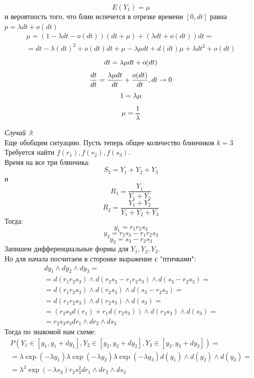 \documentclass[12pt]{article} %
\theoremstyle{definition} %
\begin{document}
\[
    E(Y_1) = \mu
\]
и вероятность того, что блин испечется в отрезке времени $[0, dt]$ равна $p = \lambda dt + o(dt)$
\begin{eqnarray*}
    \mu = (1 - \lambda dt - o(dt)) (dt + \mu) + (\lambda dt + o(dt)) dt =\\
    = dt - \lambda(dt)^2 + o(dt)dt + \mu - \lambda \mu dt + d(dt) \mu + \lambda dt^2 + o(dt)
\end{eqnarray*}
\[
    dt = \lambda \mu dt + o(dt)\\
\]
\[
    \frac{dt}{dt} = \frac{\lambda \mu dt}{dt} + \frac{o(dt)}{dt}, dt \rightarrow 0\\
\]
\[
    1 = \lambda \mu\\
\]
\[
    \mu = \frac{1}{\lambda}
\]

\textit{Случай 3}:\\
Еще обобщим ситуацию. Пусть теперь общее количество блинчиков $k = 3$\\
Требуется найти $f(r_1), f(r_2), f(s_3)$.\\
Время на все три блинчика:
\[
    S_3 = Y_1 + Y_2 + Y_3
\]
и
\[
    R_1 = \frac{Y_1}{Y_1 + Y_2}
\]
\[
    R_2 = \frac{Y_1 + Y_2}{Y_1 + Y_2 + Y_3}
\]
Тогда:
\[
    y_1 = r_1 r_2 s_3
\]
\[
    y_2 = r_2 s_3 - r_1 r_2 s_3
\]
\[
    y_3 = s_3 - r_2 s_3
\]
Запишем дифференциальные формы для $Y_1, Y_2, Y_3$.\\
Но для начала посчитаем в сторонке выражение с "птичками":
\begin{eqnarray*}
    dy_1 \wedge dy_2 \wedge dy_3 =\\
    = d(r_1 r_2 s_3) \wedge d(r_2 s_3 - r_1 r_2 s_3) \wedge d(s_3 - r_2 s_3) =\\
    = d(r_1 r_2 s_3) \wedge d(r_2 s_3) \wedge d(s_3 - r_2 s_3) =\\
    = d(r_1 r_2 s_3) \wedge d(r_2 s_3) \wedge d(s_3) =\\
    = (r_2 s_3 d(r_1) + r_1 d(r_2 s_3)) \wedge d(r_2 s_3) \wedge d(s_3) =\\
    = r_2 s_3 s_3 dr_1 \wedge dr_2 \wedge ds_3
\end{eqnarray*}
Тогда по знакомой нам схеме:
\begin{eqnarray*}
    P(Y_1 \in [y_1, y_1 + dy_1], Y_2 \in [y_2, y_2 + dy_2], Y_3 \in [y_3, y_3 + dy_3]) =\\
    = \lambda \exp(- \lambda y_1) \lambda \exp(- \lambda y_2) \lambda \exp(- \lambda y_3) d(y_1) \wedge d(y_2) \wedge d(y_3) =\\
    = \lambda^3 \exp(- \lambda s_3) r_2 s_3^2 dr_1 \wedge dr_2 \wedge ds_3
\end{eqnarray*}
\end{document}
